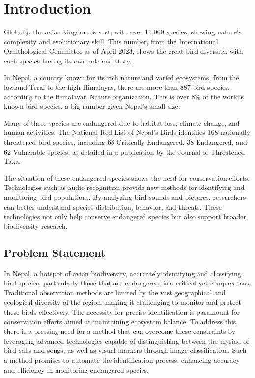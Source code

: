 \newpage
{}

\chapter{Introduction}\label{sec}
Globally, the avian kingdom is vast, with over 11,000 species, showing nature's
complexity and evolutionary skill. This number, from the International
Ornithological Committee as of April 2023, shows the great bird diversity, with
each species having its own role and story.\cite{ioc_updates}

In Nepal, a country known for its rich nature and varied ecosystems, from the
lowland Terai to the high Himalayas, there are more than 887 bird species,
according to the Himalayan Nature organization. This is over 8\% of the world's
known bird species, a big number given Nepal's small size.\cite{himalayan}

Many of these species are endangered due to habitat loss, climate change, and
human activities. The National Red List of Nepal's Birds identifies 168
nationally threatened bird species, including 68 Critically Endangered, 38
Endangered, and 62 Vulnerable species, as detailed in a publication by the
Journal of Threatened Taxa.\cite{inskipp2017nepala}

The situation of these endangered species shows the need for conservation
efforts. Technologies such as audio recognition provide new methods for
identifying and monitoring bird populations. By analyzing bird sounds and
pictures, researchers can better understand species distribution, behavior, and
threats. These technologies not only help conserve endangered species but also
support broader biodiversity research.

\section{Problem Statement}
In Nepal, a hotspot of avian biodiversity, accurately identifying and
classifying bird species, particularly those that are endangered, is a critical
yet complex task. Traditional observation methods are limited by the vast
geographical and ecological diversity of the region, making it challenging to
monitor and protect these birds effectively. The necessity for precise
identification is paramount for conservation efforts aimed at maintaining
ecosystem balance. To address this, there is a pressing need for a method that
can overcome these constraints by leveraging advanced technologies capable of
distinguishing between the myriad of bird calls and songs, as well as visual
markers through image classification. Such a method promises to automate the
identification process, enhancing accuracy and efficiency in monitoring
endangered species.

